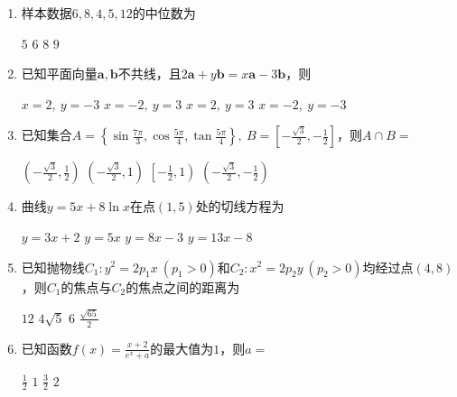 \documentclass[12pt,a4paper]{article}
\begin{document}
	\begin{enumerate}[leftmargin=*,label=\arabic*.,itemsep=0.8ex]
		\item 样本数据$6, 8, 4, 5, 12$的中位数为
		
		\begin{choicesFour}
			\choice $5$ \choice $6$ \choice $8$ \choice $9$
		\end{choicesFour}
		
		\item 已知平面向量$\boldsymbol{a},\boldsymbol{b}$不共线，且$2\boldsymbol{a} + y\boldsymbol{b} = x\boldsymbol{a} - 3\boldsymbol{b}$，则
		
		\begin{choicesFour}
			\choice $x=2,\ y=-3$ \choice $x=-2,\ y=3$ \choice $x=2,\ y=3$ \choice $x=-2,\ y=-3$
		\end{choicesFour}
		
		\item 已知集合$A=\left\{\sin\frac{7\pi}{3},\cos\frac{5\pi}{4},\tan\frac{5\pi}{4}\right\},\ B=\left[-\frac{\sqrt{3}}{2},-\frac{1}{2}\right]$，则$A\cap B=$
		
		\begin{choicesFour}
			\choice $\left(-\frac{\sqrt{3}}{2},\frac{1}{2}\right)$ \choice $\left(-\frac{\sqrt{3}}{2},1\right)$ \choice $\left[-\frac{1}{2},1\right)$ \choice $\left(-\frac{\sqrt{3}}{2},-\frac{1}{2}\right)$
		\end{choicesFour}
		
		\item 曲线$y=5x+8\ln x$在点$(1,5)$处的切线方程为
		
		\begin{choicesFour}
			\choice $y=3x+2$ \choice $y=5x$ \choice $y=8x-3$ \choice $y=13x-8$
		\end{choicesFour}
		
		\item 已知抛物线$C_1:y^2=2p_1x\ (p_1>0)$和$C_2:x^2=2p_2y\ (p_2>0)$均经过点$(4,8)$，则$C_1$的焦点与$C_2$的焦点之间的距离为
		
		\begin{choicesFour}
			\choice $12$ \choice $4\sqrt{5}$ \choice $6$ \choice $\frac{\sqrt{65}}{2}$
		\end{choicesFour}
		
		\item 已知函数$f(x)=\frac{x+2}{e^x+a}$的最大值为$1$，则$a=$
		
		\begin{choicesFour}
			\choice $\frac{1}{2}$ \choice $1$ \choice $\frac{3}{2}$ \choice $2$
		\end{choicesFour}
		

\end{enumerate}
\end{document}
